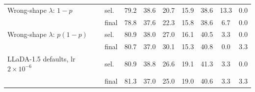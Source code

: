 \begin{table}[h]
\begin{center}
{\begin{tabular}{llccccccc}
Wrong-shape $\lambda$: $1{-}p$ & sel. & 79.2 & 38.6 & 20.7 & 15.9 & 38.6 & 13.3 & 0.0 \\
 & final & 78.8 & 37.6 & 22.3 & 15.8 & 38.6 & 6.7 & 0.0 \\
Wrong-shape $\lambda$: $p(1{-}p)$ & sel. & 80.9 & 38.0 & 27.0 & 16.1 & 40.5 & 3.3 & 0.0 \\
 & final & 80.7 & 37.0 & 30.1 & 15.3 & 40.8 & 0.0 & 3.3 \\
LLaDA-1.5 defaults, lr $2{\times}10^{-6}$ & sel. & 80.9 & 38.8 & 26.6 & 19.1 & 41.3 & 3.3 & 0.0 \\
 & final & 81.3 & 37.0 & 25.0 & 19.0 & 40.6 & 3.3 & 3.3 \\
\bottomrule
\end{tabular}}
\end{center}
\end{table}
